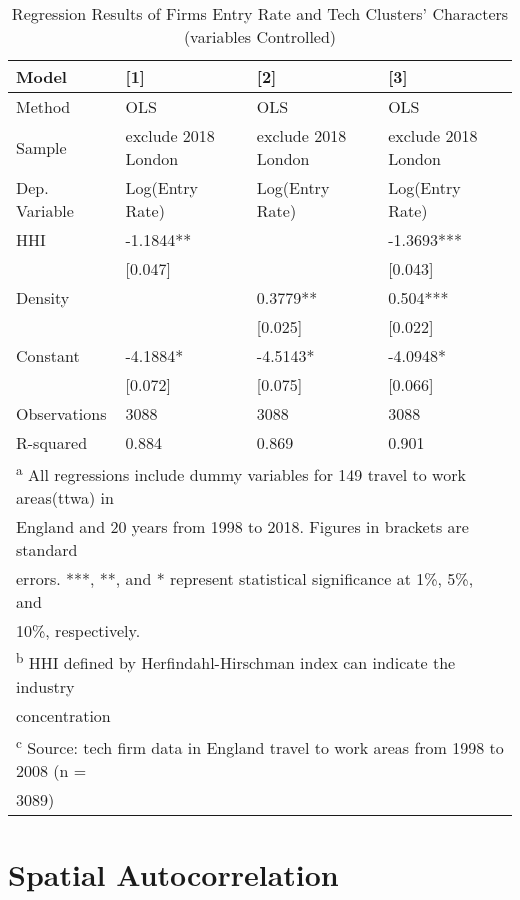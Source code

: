 \documentclass[
  12pt,
  oneside]{book}
\begin{document}
\begin{table}

\caption{\label{tab:tab-regression-control-var}Regression Results of Firms Entry Rate and Tech Clusters' Characters (variables Controlled)}
\centering
\begin{tabular}[t]{llll}
\toprule
\textbf{Model} & \textbf{{}[1]} & \textbf{{}[2]} & \textbf{{}[3]}\\
\midrule
Method & OLS & OLS & OLS\\
Sample & exclude 2018 London & exclude 2018 London & exclude 2018 London\\
Dep. Variable & Log(Entry Rate) & Log(Entry Rate) & Log(Entry Rate)\\
\midrule
HHI & -1.1844** &  & -1.3693***\\
 & {}[0.047] &  & {}[0.043]\\
\addlinespace
Density &  & 0.3779** & 0.504***\\
 &  & {}[0.025] & {}[0.022]\\
Constant & -4.1884* & -4.5143* & -4.0948*\\
 & {}[0.072] & {}[0.075] & {}[0.066]\\
\midrule
Observations & 3088 & 3088 & 3088\\
\addlinespace
R-squared & 0.884 & 0.869 & 0.901\\
\bottomrule
\multicolumn{4}{l}{\textsuperscript{a} All regressions include dummy variables for 149 travel to work areas(ttwa) in}\\
\multicolumn{4}{l}{England and 20 years from 1998 to 2018. Figures in brackets are standard}\\
\multicolumn{4}{l}{errors. ***, **, and * represent statistical significance at 1\%, 5\%, and}\\
\multicolumn{4}{l}{10\%, respectively.}\\
\multicolumn{4}{l}{\textsuperscript{b} HHI defined by Herfindahl-Hirschman index can indicate the industry}\\
\multicolumn{4}{l}{concentration}\\
\multicolumn{4}{l}{\textsuperscript{c} Source: tech firm data in England travel to work areas from 1998 to 2008 (n =}\\
\multicolumn{4}{l}{3089)}\\
\end{tabular}
\end{table}

\hypertarget{spatial-autocorrelation}{%
\section{Spatial Autocorrelation}\label{spatial-autocorrelation}}
\end{document}
